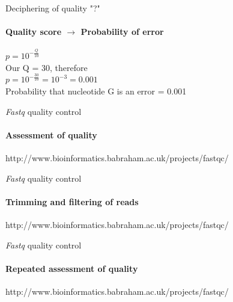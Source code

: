 \documentclass{beamer}
\begin{document}
\begin{frame}{Deciphering of quality "?"}
\framesubtitle{Quality score $\rightarrow$ Probability of error}
$p = 10^{-\frac{Q}{10}}$ \\
Our Q = 30, therefore\\
$p = 10^{-\frac{30}{10}} = 10^{-3} = 0.001$ \\
Probability that nucleotide G is an error = 0.001
\end{frame}
\begin{frame}{\textit{Fastq} quality control}
\framesubtitle{Assessment of quality}
http://www.bioinformatics.babraham.ac.uk/projects/fastqc/
\end{frame}

\begin{frame}{\textit{Fastq} quality control}
\framesubtitle{Trimming and filtering of reads}
http://www.bioinformatics.babraham.ac.uk/projects/fastqc/
\end{frame}

\begin{frame}{\textit{Fastq} quality control}
\framesubtitle{Repeated assessment of quality}
http://www.bioinformatics.babraham.ac.uk/projects/fastqc/
\end{frame}

{
\begin{frame}[plain]
\end{frame}
}
\end{document}
